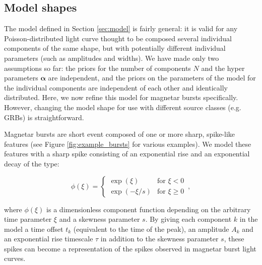 \documentclass[12pt]{emulateapj}
\newcommand{\given}{\,|\,}
\newcommand{\dd}{\mathrm{d}}
\newcommand{\counts}{y}
\newcommand{\pars}{\theta}
\newcommand{\mean}{\lambda}
\newcommand{\Poisson}{{\mathcal P}}
\newcommand{\bg}{\mathrm{bg}}
\newcommand{\word}{\phi}
\begin{document}
\subsection{Model shapes}

The model defined in Section \ref{sec:model} is fairly general: it is valid for any Poisson-distributed light curve thought to be composed several individual components of
the same shape, but with potentially different individual parameters (such as amplitudes and widths). 
We have made only two assumptions so far: the priors for the number of components $N$ and the hyper parameters $\bm{\alpha}$ are independent,
and the priors on the parameters of the model for the individual components are independent of each other and identically distributed. 
Here, we now refine this model for magnetar bursts specifically. However, changing the model shape for use with different source classes (e.g. GRBs) is straightforward.

Magnetar bursts are short event composed of one or more sharp, spike-like features (see Figure \ref{fig:example_bursts} for various examples). We model these features
with a sharp spike consisting of an exponential rise and an exponential decay of the type:

\begin{equation}
\word(\xi) = \left\{\begin{array}{ll}\exp(\xi) & \mbox{for $\xi<0$}\\ \exp(-\xi/s) & \mbox{for $\xi\geq 0$}\end{array}\right. \, ,
\end{equation}

where $\word(\xi)$ is a dimensionless component function depending on the arbitrary time parameter $\xi$ and a skewness
parameter $s$. By giving each component $k$ in the model a time offset $t_k$ (equivalent to the time of the peak), 
an amplitude $A_k$ and an exponential rise timescale $\tau$ in addition to the skewness parameter $s$, 
these spikes can become a representation of the spikes observed in magnetar burst light curves. 
\end{document}
